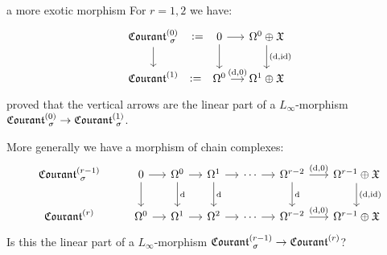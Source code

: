 \documentclass[beamer,10pt]{standalone}
\begin{document}
\begin{frame}{a more exotic morphism}
	For $r=1,2$ we have:
	\begin{displaymath}
		\begin{tikzcd}[ampersand replacement=\&,column sep = small]
			\Courant[\sigma]{0} \ar[r,phantom,":="] \ar[d]
			\&[1em]
			0 \ar[r] \ar[d]
			\& \Omega^0\oplus \X \ar[d,"{(\d,\id)}"]
			\\
			\Courant{1} \ar[r,phantom,":="] 
			\&
			\Omega^0 \ar[r,"{(\d,0)}"] 
			\& 
			\Omega^1\oplus \X
		\end{tikzcd}
	\end{displaymath}
	\cite{Zambon2012} proved that  the vertical arrows are the linear part of a $L_\infty$-morphism $\Courant[\sigma]{0} \to \Courant[\sigma]{1}$.
	\vfill

	More generally we have a morphism of chain complexes:
	\begin{displaymath}
		\begin{tikzcd}[ampersand replacement=\&,column sep = small]
			\Courant[\sigma]{r-1} %
			\&[1em]
			0 \ar[r] \ar[d]
			\& \Omega^0 \ar[d,"\d"] \ar[r]
			\& \Omega^1 \ar[d,"\d"] \ar[r]
			\& \cdots \ar[r]
			\& \Omega^{r-2} \ar[d,"\d"] \ar[r,"{(\d,0)}"]
			\&[.5em]  \Omega^{r-1} \oplus \X \ar[d,"{(\d,\id)}"]
			\\
			\Courant{r} %
			\& \Omega^0 \ar[r]
			\& \Omega^1 \ar[r]
			\& \Omega^2 \ar[r]
			\& \cdots \ar[r]
			\& \Omega^{r-2} \ar[r,"{(\d,0)}"]
			\&\Omega^{r-1} \oplus \X
		\end{tikzcd}
	\end{displaymath}
	Is this the linear part of a $L_\infty$-morphism $\Courant[\sigma]{r-1} \to \Courant{r}$?
	\vfill
\end{frame}
\end{document}
